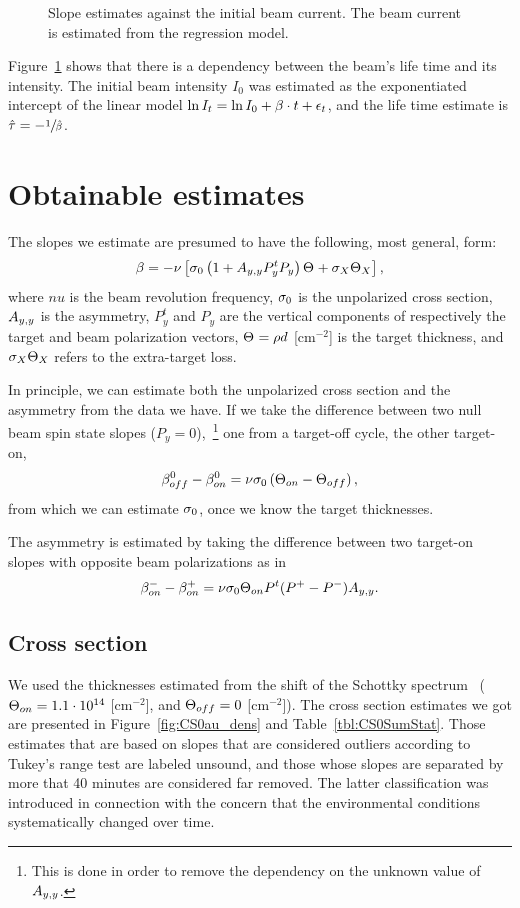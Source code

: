 \documentclass{article}
\begin{document}
\begin{figure}[h]
\begin{minipage}[t]{.5\textwidth}
			\caption{Slope estimates against the initial beam current. The beam current is estimated from the regression model.\label{fig:Slp_VS_I0}}
	\end{minipage}

\end{figure}

Figure~\ref{fig:Slp_VS_I0} shows that there is a dependency between the beam's life time and its intensity. The initial beam intensity $I_0$ was estimated as the exponentiated intercept of the linear model $\ln I_t = \ln I_0 + \slp\cdot t + \err_t$, and the life time estimate is $\hat{\tau} = -\sfrac{1}{\slp*}$. 

\section{Obtainable estimates}

The slopes we estimate are presumed to have the following, most general, form:
\begin{equation}
	\slp = -\nu\bkt*{\CS[0]\bkt{1 + \Ayy P^t_y P_y}\Thick + \CS[X]\Thick[X]},
\end{equation}
where $nu$ is the beam revolution frequency, $\CS[0]$ is the unpolarized cross section, $\Ayy$ is the asymmetry, $P^t_y$ and $P_y$ are the vertical components of respectively the target and beam polarization vectors, $\Thick = \rho d$ [cm$^{-2}$] is the target thickness, and $\CS[X]\Thick[X]$ refers to the extra-target loss.

In principle, we can estimate both the unpolarized cross section and the asymmetry from the data we have. If we take the difference between two null beam spin state slopes ($P_y = 0$),~\footnote{This is done in order to remove the dependency on the unknown value of $\Ayy$.} one from a target-off cycle, the other target-on, 
\[
	\slp[off]^0 - \slp[on]^0 = \nu\CS[0]\bkt{\Thick[on]-\Thick[off]},
\]
from which we can estimate $\CS[0]$, once we know the target thicknesses.

The asymmetry is estimated by taking the difference between two target-on slopes with opposite beam polarizations as in
\[
	\slp[on]^- - \slp[on]^+ = \nu\CS[0]\Thick[on] P^t\DP*\Ayy.
\]
\subsection{Cross section}
We used the thicknesses estimated from the shift of the Schottky spectrum~\cite{Stein} ($\Thick[on] = \vp{1.1}{14}$ [cm$^{-2}$], and $\Thick[off] = 0$ [cm$^{-2}$]). The cross section estimates we got are presented in Figure~\ref{fig:CS0au_dens} and Table~\ref{tbl:CS0SumStat}. Those estimates that are based on slopes that are considered outliers according to Tukey's range test are labeled unsound, and those whose slopes are separated by more that 40 minutes are considered far removed. The latter classification was introduced in connection with the concern that the environmental conditions systematically changed over time.
\end{document}
